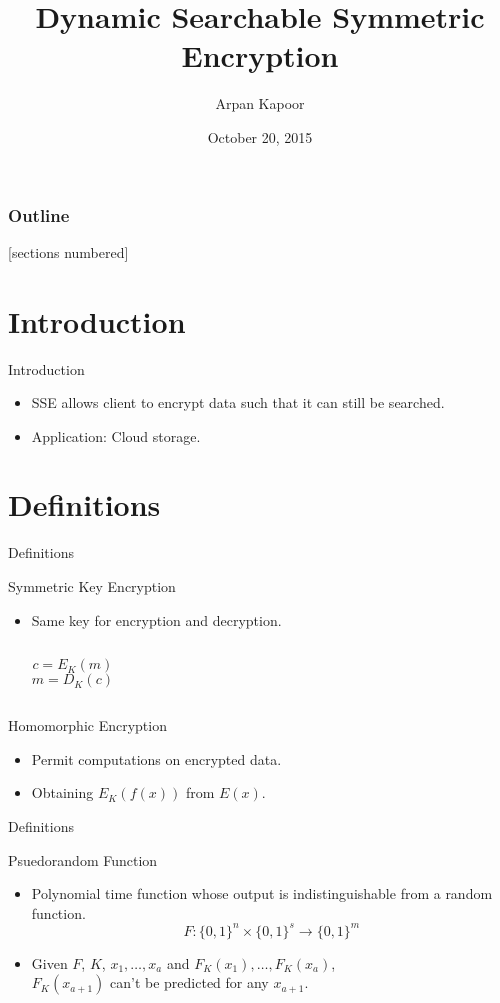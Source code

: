 \documentclass{beamer}
\title{Dynamic Searchable Symmetric Encryption}
\author{Arpan Kapoor}
\institute{National Institute of Technology, Calicut}
\date{October 20, 2015}
\begin{document}
\maketitle

\begin{frame}
	\frametitle{Outline}
	[sections numbered]
	\tableofcontents
\end{frame}

\section{Introduction}
\begin{frame}{Introduction}
\begin{itemize}
\item SSE allows client to encrypt data such that it can still be searched.
\item Application: Cloud storage.
\end{itemize}
\end{frame}

\section{Definitions}
\begin{frame}{Definitions}

\begin{block}{Symmetric Key Encryption}
\begin{itemize}
\item Same key for encryption and decryption.
\begin{columns}
	\[c = E_K(m)\]
	\[m = D_K(c)\]
\end{columns}
\end{itemize}
\end{block}

\begin{block}{Homomorphic Encryption}
\begin{itemize}
\item Permit computations on encrypted data.
\item Obtaining \(E_K(f(x))\) from \(E(x)\).
\end{itemize}
\end{block}

\end{frame}

\begin{frame}{Definitions}
\begin{block}{Psuedorandom Function}
\begin{itemize}
\item Polynomial time function whose output is indistinguishable from a
random function.
\[F \colon \{0,1\}^n \times \{0,1\}^s \rightarrow \{0,1\}^m\]
\item Given \(F\), \(K\), \(x_1, \dotsc, x_a\) and
	\(F_K(x_1),\dotsc,F_K(x_a)\), \\ \(F_K(x_{a+1})\) can't be predicted for any \(x_{a+1}\).
\end{itemize}
\end{block}
\end{frame}
\end{document}
